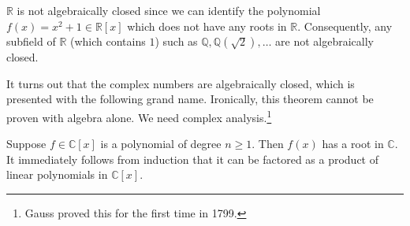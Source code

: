   \begin{example}
    $\mathbb{R}$ is not algebraically closed since we can identify the polynomial $f(x) = x^2 + 1 \in \mathbb{R}[x]$ which does not have any roots in $\mathbb{R}$. Consequently, any subfield of $\mathbb{R}$ (which contains $1$) such as $\mathbb{Q}, \mathbb{Q}(\sqrt{2}), \ldots$ are not algebraically closed. 
  \end{example}

  It turns out that the complex numbers are algebraically closed, which is presented with the following grand name. Ironically, this theorem cannot be proven with algebra alone. We need complex analysis.\footnote{Gauss proved this for the first time in 1799.} 

  \begin{theorem}
    Suppose $f \in \mathbb{C}[x]$ is a polynomial of degree $n \geq 1$. Then $f(x)$ has a root in $\mathbb{C}$. It immediately follows from induction that it can be factored as a product of linear polynomials in $\mathbb{C}[x]$. 
  \end{theorem}
